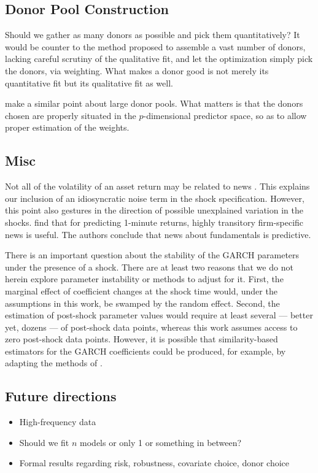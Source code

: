 \documentclass[11pt,3p,review,authoryear]{elsarticle}
\theoremstyle{definition}
\begin{document}
\subsection{Donor Pool Construction}

Should we gather as many donors as possible and pick them quantitatively?  It would be counter to the method proposed to assemble a vast number of donors, lacking careful scrutiny of the qualitative fit, and let the optimization simply pick the donors, via weighting.  What makes a donor good is not merely its quantitative fit but its qualitative fit as well.

\citet{abadie2022synthetic} make a similar point about large donor pools.  What matters is that the donors chosen are properly situated in the $p$-dimensional predictor space, so as to allow proper estimation of the weights.

\subsection{Misc}

Not all of the volatility of an asset return may be related to news \citep{boudoukh2019information}.  This explains our inclusion of an idiosyncratic noise term in the shock specification.  However, this point also gestures in the direction of possible unexplained variation in the shocks.  \citet{chinco2019sparse} find that for predicting 1-minute returns, highly transitory firm-specific news is useful.  The authors conclude that news about fundamentals is predictive.

There is an important question about the stability of the GARCH parameters under the presence of a shock.  There are at least two reasons that we do not herein explore parameter instability or methods to adjust for it.  First, the marginal effect of coefficient changes at the shock time would, under the assumptions in this work, be swamped by the random effect.  Second, the estimation of post-shock parameter values would require at least several --- better yet, dozens --- of post-shock data points, whereas this work assumes access to zero post-shock data points.  However, it is possible that similarity-based estimators for the GARCH coefficients could be produced, for example, by adapting the methods of \citet{dendramis2020similarity}.
\subsection{Future directions}
\begin{itemize}
  \item High-frequency data
  \item Should we fit $n$ models or only 1 or something in between?
  \item Formal results regarding risk, robustness, covariate choice, donor choice
\end{itemize}
\end{document}
